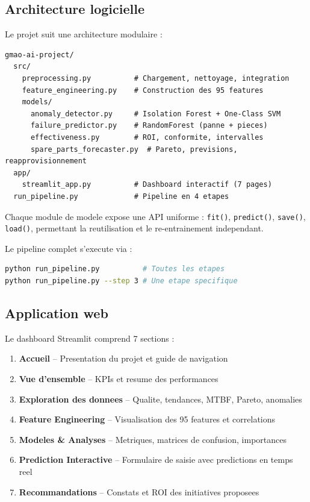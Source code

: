 \documentclass[12pt,a4paper]{article}
\begin{document}
\subsection{Architecture logicielle}

Le projet suit une architecture modulaire :

\begin{lstlisting}
gmao-ai-project/
  src/
    preprocessing.py          # Chargement, nettoyage, integration
    feature_engineering.py    # Construction des 95 features
    models/
      anomaly_detector.py     # Isolation Forest + One-Class SVM
      failure_predictor.py    # RandomForest (panne + pieces)
      effectiveness.py        # ROI, conformite, intervalles
      spare_parts_forecaster.py  # Pareto, previsions, reapprovisionnement
  app/
    streamlit_app.py          # Dashboard interactif (7 pages)
  run_pipeline.py             # Pipeline en 4 etapes
\end{lstlisting}

Chaque module de modele expose une API uniforme : \texttt{fit()}, \texttt{predict()}, \texttt{save()}, \texttt{load()}, permettant la reutilisation et le re-entrainement independant.

Le pipeline complet s'execute via :
\begin{lstlisting}[language=bash]
python run_pipeline.py          # Toutes les etapes
python run_pipeline.py --step 3 # Une etape specifique
\end{lstlisting}

\subsection{Application web}

Le dashboard Streamlit comprend 7 sections :

\begin{enumerate}
  \item \textbf{Accueil} -- Presentation du projet et guide de navigation
  \item \textbf{Vue d'ensemble} -- KPIs et resume des performances
  \item \textbf{Exploration des donnees} -- Qualite, tendances, MTBF, Pareto, anomalies
  \item \textbf{Feature Engineering} -- Visualisation des 95 features et correlations
  \item \textbf{Modeles \& Analyses} -- Metriques, matrices de confusion, importances
  \item \textbf{Prediction Interactive} -- Formulaire de saisie avec predictions en temps reel
  \item \textbf{Recommandations} -- Constats et ROI des initiatives proposees
\end{enumerate}
\end{document}
